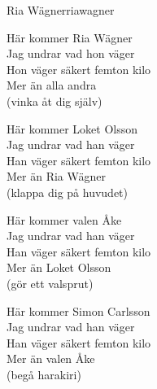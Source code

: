 \begin{song}{Ria Wägner}{riawagner}
\begin{vers}
Här kommer Ria Wägner\\
Jag undrar vad hon väger\\
Hon väger säkert femton kilo\\
Mer än alla andra\\
(vinka åt dig själv)\\
\end{vers}
\begin{vers}
Här kommer Loket Olsson\\
Jag undrar vad han väger\\
Han väger säkert femton kilo\\
Mer än Ria Wägner\\
(klappa dig på huvudet)\\
\end{vers}
\begin{vers}
Här kommer valen Åke\\
Jag undrar vad han väger\\
Han väger säkert femton kilo\\
Mer än Loket Olsson\\
(gör ett valsprut)\\
\end{vers}
\begin{vers}
Här kommer Simon Carlsson\\
Jag undrar vad han väger\\
Han väger säkert femton kilo\\
Mer än valen Åke\\
(begå harakiri)
\end{vers}
\end{song}
